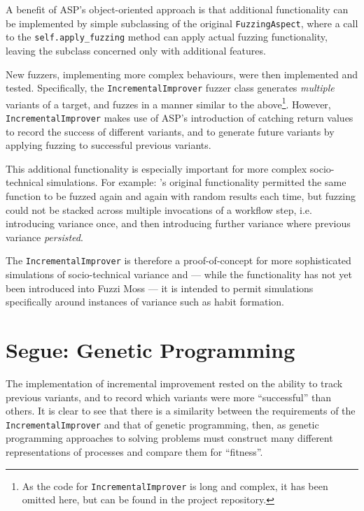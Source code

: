 \documentclass{article}
\begin{document}
A benefit of ASP's object-oriented approach is that additional functionality can
be implemented by simple subclassing of the original \texttt{FuzzingAspect},
where a call to the \texttt{self.apply\_fuzzing} method can apply actual fuzzing
functionality, leaving the subclass concerned only with additional features.\par

New fuzzers, implementing more complex behaviours, were then implemented and
tested. Specifically, the \texttt{IncrementalImprover} fuzzer class generates
\emph{multiple} variants of a target, and fuzzes in a manner similar to the
above\footnote{As the code for \texttt{IncrementalImprover} is long and complex,
  it has been omitted here, but can be found in the project
  repository\cite{pydysofu_repo}.}. However, \texttt{IncrementalImprover} makes use
of ASP's introduction of catching return values to record the success of
different variants, and to generate future variants by applying fuzzing to
successful previous variants.\par

This additional functionality is especially important for more complex
socio-technical simulations. For example: \pdsf{}'s original functionality
permitted the same function to be fuzzed again and again with random results
each time, but fuzzing could not be stacked across multiple invocations of a
workflow step, i.e. introducing variance once, and then introducing further
variance where previous variance \emph{persisted}.\par

The \texttt{IncrementalImprover} is therefore a proof-of-concept for more
sophisticated simulations of socio-technical variance and --- while the
functionality has not yet been introduced into Fuzzi Moss --- it is intended to
permit simulations specifically around instances of variance such as habit
formation.\par


\section{Segue: Genetic Programming}
The implementation of incremental improvement rested on the ability to track
previous variants, and to record which variants were more ``successful'' than
others. It is clear to see that there is a similarity between the requirements
of the \texttt{IncrementalImprover} and that of genetic programming, then, as
genetic programming approaches to solving problems must construct many different
representations of processes and compare them for ``fitness''.\par
\end{document}
